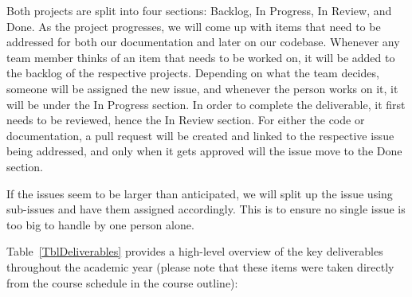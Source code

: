 \documentclass{article}
\begin{document}
Both projects are split into four sections: Backlog, In Progress, In Review, and Done. As the project progresses, we will come up with items that need to be addressed for both our documentation and later on our codebase. Whenever any team member thinks of an item that needs to be worked on, it will be added to the backlog of the respective projects. Depending on what the team decides, someone will be assigned the new issue, and whenever the person works on it, it will be under the In Progress section. In order to complete the deliverable, it first needs to be reviewed, hence the In Review section. For either the code or documentation, a pull request will be created and linked to the respective issue being addressed, and only when it gets approved will the issue move to the Done section. 

If the issues seem to be larger than anticipated, we will split up the issue using sub-issues and have them assigned accordingly. This is to ensure no single issue is too big to handle by one person alone. 

Table~\ref{TblDeliverables} provides a high-level overview of the key deliverables throughout the academic year (please note that these items were taken directly from the course schedule in the course outline): 
\end{document}
